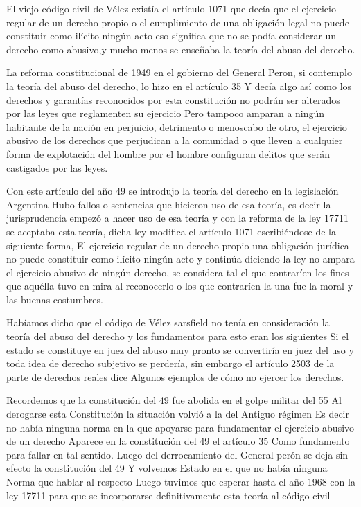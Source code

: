 \documentclass[12pt]{book}
\begin{document}
El viejo código civil de Vélez existía el artículo 1071 que decía que el ejercicio regular de un derecho propio o el cumplimiento de una obligación legal no puede constituir como ilícito ningún acto eso significa que no se podía considerar un derecho como abusivo,y mucho menos se enseñaba la teoría del abuso del derecho.

La reforma constitucional de 1949 en el gobierno del General Peron, si contemplo la teoría del abuso del derecho, lo hizo en el artículo 35 Y decía algo así como los derechos y garantías reconocidos por esta constitución no podrán ser alterados por las leyes que reglamenten su ejercicio Pero tampoco amparan a ningún habitante de la nación en perjuicio, detrimento o menoscabo de otro, el ejercicio abusivo de los derechos que perjudican a la comunidad  o que lleven a cualquier forma de explotación del hombre por el hombre configuran delitos que serán castigados por las leyes.

Con este artículo del año 49 se introdujo la teoría del derecho en la legislación Argentina Hubo fallos o sentencias que hicieron uso de esa teoría, es decir la jurisprudencia empezó a hacer uso de esa teoría y con la reforma de la ley 17711 se aceptaba esta teoría, dicha ley modifica el artículo 1071 escribiéndose de la siguiente forma, El ejercicio regular de un derecho propio una obligación jurídica no puede constituir como ilícito ningún acto y continúa diciendo la ley no ampara el ejercicio abusivo de ningún derecho, se considera tal el que contraríen los fines que aquélla tuvo en mira al reconocerlo o los que contraríen la una fue la moral y las buenas costumbres. 


Habíamos dicho que el código de Vélez sarsfield no tenía en consideración la teoría del abuso del derecho y los fundamentos para esto eran los siguientes Si el estado se constituye en juez del abuso muy pronto se convertiría en juez del uso y toda idea de derecho subjetivo se perdería, sin embargo el artículo 2503 de la parte de derechos reales dice Algunos ejemplos de cómo no ejercer los derechos.

Recordemos que la constitución del 49 fue abolida en el golpe militar del 55 Al derogarse esta Constitución la situación volvió a la del Antiguo régimen Es decir no había ninguna norma en la que apoyarse para fundamentar el ejercicio abusivo de un derecho Aparece en la constitución del 49 el artículo 35 Como fundamento para fallar en tal sentido.
Luego del derrocamiento del General perón se deja sin efecto la constitución del 49  Y volvemos Estado en el que no había ninguna Norma que hablar al respecto Luego tuvimos que esperar hasta el año 1968 con la ley 17711 para que se incorporarse definitivamente esta teoría al código civil 
\end{document}
